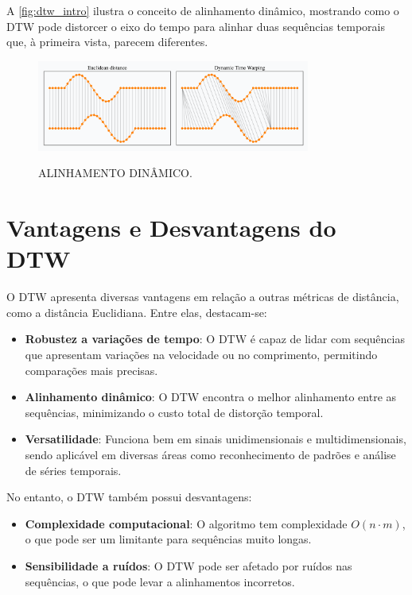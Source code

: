 A \autoref{fig:dtw_intro} ilustra o conceito de alinhamento dinâmico, mostrando como o DTW pode distorcer o eixo do tempo para alinhar duas sequências temporais que, à primeira vista, parecem diferentes.

\begin{figure}[h!]
    \centering
    \caption{ALINHAMENTO DINÂMICO.}
    \includegraphics[width=0.8\textwidth]{fig/dtw_vs_euc.png}
    \label{fig:dtw_intro}
\end{figure}

\section{Vantagens e Desvantagens do DTW}

O DTW apresenta diversas vantagens em relação a outras métricas de distância, como a distância Euclidiana. Entre elas, destacam-se:
\begin{itemize}
    \item \textbf{Robustez a variações de tempo}: O DTW é capaz de lidar com sequências que apresentam variações na velocidade ou no comprimento, permitindo comparações mais precisas.
    \item \textbf{Alinhamento dinâmico}: O DTW encontra o melhor alinhamento entre as sequências, minimizando o custo total de distorção temporal.
    \item \textbf{Versatilidade}: Funciona bem em sinais unidimensionais e multidimensionais, sendo aplicável em diversas áreas como reconhecimento de padrões e análise de séries temporais.
\end{itemize}

No entanto, o DTW também possui desvantagens:
\begin{itemize}
    \item \textbf{Complexidade computacional}: O algoritmo tem complexidade \(O(n \cdot m)\), o que pode ser um limitante para sequências muito longas.
    \item \textbf{Sensibilidade a ruídos}: O DTW pode ser afetado por ruídos nas sequências, o que pode levar a alinhamentos incorretos.
\end{itemize}


